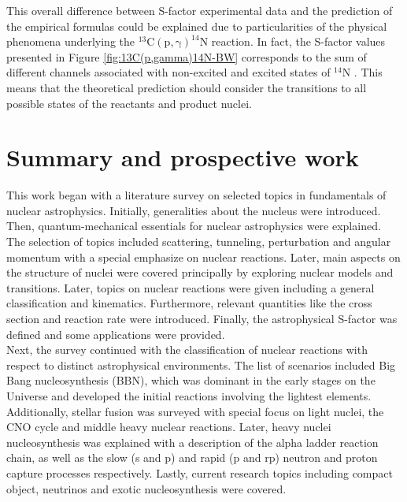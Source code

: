 \documentclass[openany]{book}
\begin{document}
This overall difference between S-factor experimental data and the prediction of the empirical formulas could be explained due to particularities of the physical phenomena underlying the $\mathrm{{}^{13}C(p, \gamma)^{14}N}$ reaction. In fact, the S-factor values presented in Figure \ref{fig:13C(p,gamma)14N-BW} corresponds to the sum of different channels associated with non-excited and excited states of $\mathrm{{}^{14}N}$ \cite{xu_takahashi_goriely_arnould_ohta_utsunomiya_2013}. This means that the theoretical prediction should consider the transitions to all possible states of the reactants and product nuclei. 

\chapter{Summary and prospective work} \label{ch:summary}

This work began with a literature survey on selected topics in fundamentals of nuclear astrophysics. Initially, generalities about the nucleus were introduced. Then, quantum-mechanical essentials for nuclear astrophysics were explained. The selection of topics included scattering, tunneling, perturbation and angular momentum with a special emphasize on nuclear reactions. Later, main aspects on the structure of nuclei were covered principally by exploring nuclear models and transitions. Later, topics on nuclear reactions were given including a general classification and kinematics. Furthermore, relevant quantities like the cross section and reaction rate were introduced. Finally, the astrophysical S-factor was defined and some applications were provided. \\

Next, the survey continued with the classification of nuclear reactions with respect to distinct astrophysical environments. The list of scenarios included Big Bang nucleosynthesis (BBN), which was dominant in the early stages on the Universe and developed the initial reactions involving the lightest elements. Additionally, stellar fusion was surveyed with special focus on light nuclei, the CNO cycle and middle heavy nuclear reactions. Later, heavy nuclei nucleosynthesis was explained with a description of the alpha ladder reaction chain, as well as the slow (s and p) and rapid (p and rp) neutron and proton capture processes respectively. Lastly, current research topics including compact object, neutrinos and exotic nucleosynthesis were covered. \\
\end{document}

